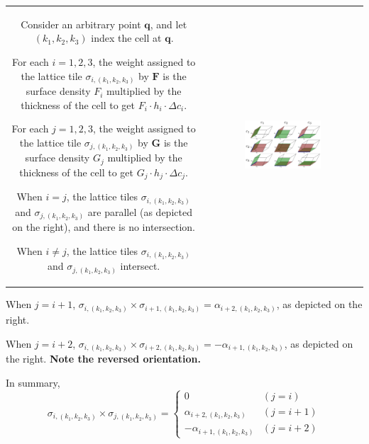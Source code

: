 \documentclass{book}
\begin{document}
\begin{tabular}{cc}
\parbox{0.5\textwidth}{
Consider an arbitrary point \(\mathbf{q}\), and let \((k_1, k_2, k_3)\) index the cell at \(\mathbf{q}\). 

For each \(i = 1, 2, 3\), the weight assigned to the lattice tile \(\sigma_{i,(k_1,k_2,k_3)}\) by \(\mathbf{F}\) is the surface density \(F_i\) multiplied by the thickness of the cell to get \(F_i \cdot h_i \cdot \Delta c_i\). 

For each \(j = 1, 2, 3\), the weight assigned to the lattice tile \(\sigma_{j,(k_1,k_2,k_3)}\) by \(\mathbf{G}\) is the surface density \(G_j\) multiplied by the thickness of the cell to get \(G_j \cdot h_j \cdot \Delta c_j\). 

When \(i = j\), the lattice tiles \(\sigma_{i, (k_1, k_2, k_3)}\) and \(\sigma_{j, (k_1, k_2, k_3)}\) are parallel (as depicted on the right), and there is no intersection. 

When \(i \neq j\), the lattice tiles \(\sigma_{i, (k_1, k_2, k_3)}\) and \(\sigma_{j, (k_1, k_2, k_3)}\) intersect. 
} & \parbox{0.5\textwidth}{
\includegraphics[width = 0.5\textwidth]{Coordinate_systems/surface_surface_intersection_cell}
}
\end{tabular}

\vspace{1mm}

When \(j = i + 1\), \(\sigma_{i, (k_1, k_2, k_3)} \times \sigma_{i+1, (k_1, k_2, k_3)} = \alpha_{i+2, (k_1, k_2, k_3)}\), as depicted on the right. 

When \(j = i + 2\), \(\sigma_{i, (k_1, k_2, k_3)} \times \sigma_{i+2, (k_1, k_2, k_3)} = -\alpha_{i+1, (k_1, k_2, k_3)}\), as depicted on the right. {\bf Note the reversed orientation.} 

In summary, 
\[\sigma_{i, (k_1,k_2,k_3)} \times \sigma_{j, (k_1,k_2,k_3)} = \left\{\begin{array}{cc} 0 & (j = i) \\ \alpha_{i+2, (k_1, k_2, k_3)} & (j = i+1) \\ -\alpha_{i+1, (k_1, k_2, k_3)} & (j = i+2) \end{array}\right.\]
\end{document}
